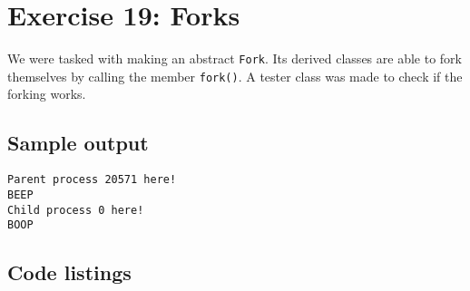 \documentclass[11pt]{article}
\begin{document}
\section*{Exercise 19: Forks}
We were tasked with making an abstract \texttt{Fork}.
Its derived classes are able to fork themselves by calling the member \texttt{fork()}.
A tester class was made to check if the forking works.

\subsection*{Sample output}
\begin{lstlisting}
Parent process 20571 here!
BEEP
Child process 0 here!
BOOP
\end{lstlisting}

\subsection*{Code listings}







\end{document}

